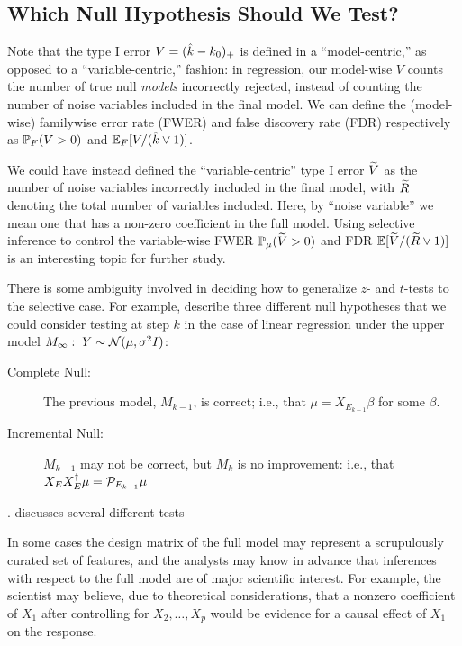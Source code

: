 \documentclass{article}
\begin{document}
\subsection{Which Null Hypothesis Should We Test?}

Note that the type I error $V=(\hk-k_0)_+$ is defined in a ``model-centric,'' as opposed to a ``variable-centric,'' fashion: in regression, our model-wise $V$ counts the number of true null {\em models} incorrectly rejected, instead of counting the number of noise variables included in the final model. We can define the (model-wise) familywise error rate (FWER) and false discovery rate (FDR) respectively as $\P_F(V >0)$ and $\E_F[V/(\hk \vee 1)]$. 

We could have instead defined the ``variable-centric'' type I error $\tV$ as the number of noise variables incorrectly included in the final model, with $\tR$ denoting the total number of variables included. Here, by ``noise variable'' we mean one that has a non-zero coefficient in the full model. Using selective inference to control the variable-wise FWER $\P_\mu(\tV>0)$ and FDR $\E[\tV / (\tR \vee 1)]$ is an interesting topic for further study.

There is some ambiguity involved in deciding how to generalize $z$- and $t$-tests to the selective case. For example, \citet{gsell2013sequential} describe three different null hypotheses that we could consider testing at step $k$ in the case of linear regression under the upper model $M_\infty:\; Y\sim \cN(\mu, \sigma^2 I)$:
\begin{description}
\item[Complete Null:] The previous model, $M_{k-1}$, is correct; i.e., that $\mu = X_{E_{k-1}}\beta$ for some $\beta$.
\item[Incremental Null:] $M_{k-1}$ may not be correct, but $M_k$ is no improvement: i.e., that $X_EX_E^\dagger\mu = \proj_{E_{k-1}}\mu$
\end{description}
. \citet{fithian2014optimal} discusses several different tests 

In some cases the design matrix of the full model may represent a  scrupulously curated set of features, and the analysts may know in advance that inferences with respect to the full model are of major scientific interest. For example, the scientist may believe, due to theoretical considerations, that a nonzero coefficient of $X_1$ after controlling for $X_2,\ldots,X_p$ would be evidence for a causal effect of $X_1$ on the response.
\end{document}
